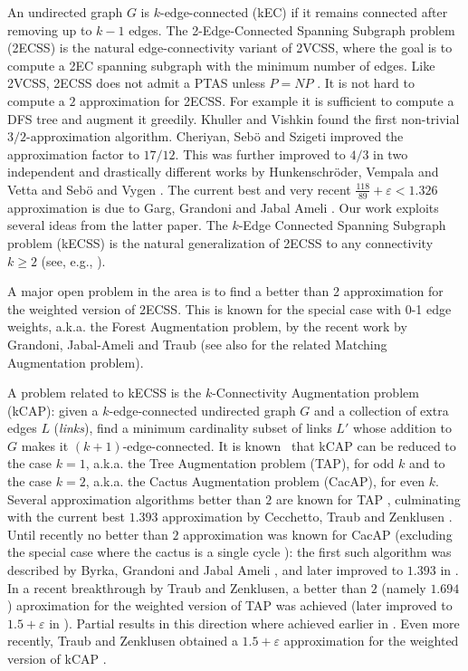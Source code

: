 \documentclass{article}
\newcommand{\eps}{\varepsilon}
\begin{document}
An undirected graph $G$ is $k$-edge-connected (kEC) if it remains connected after removing up to $k-1$ edges. The 2-Edge-Connected Spanning Subgraph problem (2ECSS) is the natural edge-connectivity variant of 2VCSS, where the goal is to compute a 2EC spanning subgraph with the minimum number of edges. Like 2VCSS, 2ECSS does not admit a PTAS unless $P=NP$ \cite{CL99}. It is not hard to compute a $2$ approximation for 2ECSS. For example it is sufficient to compute a DFS tree and augment it greedily. Khuller and Vishkin \cite{KV92} found the first non-trivial $3/2$-approximation algorithm. Cheriyan, Seb{\"{o}} and Szigeti \cite{CSS01} improved the approximation factor to $17/12$. This was further improved to $4/3$ in two independent and drastically different works by Hunkenschr{\"o}der, Vempala and Vetta \cite{HVV19} and Seb{\"o} and Vygen \cite{SV14}. The current best and very recent $\frac{118}{89}+\eps<1.326$ approximation is due to Garg, Grandoni and Jabal Ameli \cite{GGJ23}. Our work exploits several ideas from the latter paper. The $k$-Edge Connected Spanning Subgraph problem (kECSS) is the natural generalization of 2ECSS to any connectivity $k\geq 2$ (see, e.g., \cite{CT00,GG12}).

A major open problem in the area is to find a better than 2 approximation for the weighted version of 2ECSS. This is known for the special case with 0-1 edge weights, a.k.a. the Forest Augmentation problem, by the recent work by Grandoni, Jabal-Ameli and Traub \cite{GJT22} (see also \cite{BDS22,CDGKN20,CCDZ20} for the related Matching Augmentation problem). 


A problem related to kECSS is the $k$-Connectivity Augmentation problem (kCAP): given a $k$-edge-connected undirected graph $G$ and a collection of extra edges $L$ (\emph{links}), find a minimum cardinality subset of links $L'$ whose addition to $G$ makes it $(k+1)$-edge-connected. It is known~\cite{DKL76} that kCAP can be reduced to the case $k=1$, a.k.a. the Tree Augmentation problem (TAP), for odd $k$ and to the case $k=2$, a.k.a. the Cactus Augmentation problem (CacAP), for even $k$. Several approximation algorithms better than $2$ are known for TAP \cite{A17,CG18,CG18a,EFKN09,FGKS18,GKZ18,KN16,KN16b,N03}, culminating with the current best $1.393$ approximation by Cecchetto, Traub and Zenklusen \cite{CTZ21}. Until recently no better than $2$ approximation was known for CacAP (excluding the special case where the cactus is a single cycle \cite{GGJS19}): the first such algorithm was described by Byrka, Grandoni and Jabal Ameli \cite{BGJ20}, and later improved to $1.393$ in \cite{CTZ21}. In a recent breakthrough by Traub and Zenklusen, a better than $2$ (namely $1.694$) aproximation for the weighted version of TAP was achieved \cite{TZ21} (later improved to $1.5+\eps$ in \cite{TZ23}). Partial results in this direction where achieved earlier in \cite{A17,CN13,FGKS18,GKZ18,N17}. Even more recently, Traub and Zenklusen obtained a $1.5+\eps$ approximation for the weighted version of kCAP \cite{TZ23}.
\end{document}
